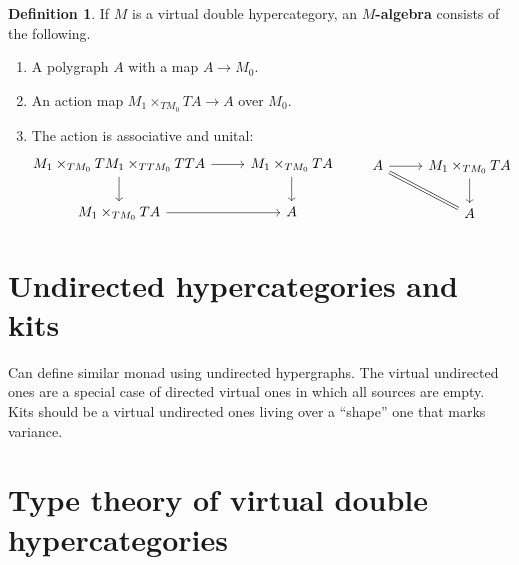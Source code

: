 \documentclass{article}
\theoremstyle{definition}
\newtheorem{defn}[thm]{Definition}
\theoremstyle{remark}
\begin{document}
\begin{defn}
  If $M$ is a virtual double hypercategory, an \textbf{$M$-algebra} consists of the following.
  \begin{enumerate}
  \item A polygraph $A$ with a map $A \to M_0$.
  \item An action map $M_1 \times_{TM_0} TA \to A$ over $M_0$.
  \item The action is associative and unital:
    \[\hspace{-2cm}
    \begin{tikzcd}
      M_1 \times_{TM_0} TM_1 \times_{TTM_0} TTA \ar[r] \ar[d] &M_1 \times_{TM_0} TA \ar[d]\\
      M_1 \times_{TM_0} TA \ar[r] & A
    \end{tikzcd}
    \qquad
    \begin{tikzcd}
      A \ar[r] \ar[dr,equals] & M_1 \times_{TM_0} TA\ar[d] \\ & A
    \end{tikzcd}\hspace{-2cm}
    \]
  \end{enumerate}
\end{defn}


\section{Undirected hypercategories and kits}
\label{sec:kits}

Can define similar monad using undirected hypergraphs.
The virtual undirected ones are a special case of directed virtual ones in which all sources are empty.
Kits should be a virtual undirected ones living over a ``shape'' one that marks variance.


\section{Type theory of virtual double hypercategories}
\label{sec:type-theory}
\end{document}
